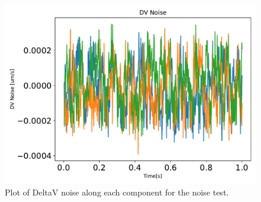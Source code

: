 \begin{figure}[htbp]\centerline{\includegraphics[height=0.7\textwidth, keepaspectratio]{AutoTeX/DVnoise}}\caption{Plot of DeltaV noise along each component for the noise test.}\label{fig:DVnoise}\end{figure}